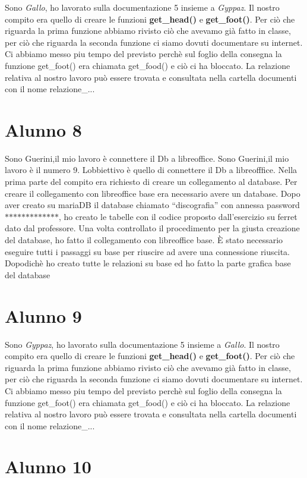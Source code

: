 Sono {\itshape Gallo}, ho lavorato sulla documentazione 5 insieme a {\itshape Gyppaz}. Il nostro compito era quello di creare le funzioni {\bfseries{get\+\_\+head()}} e {\bfseries{get\+\_\+foot()}}. Per ciò che riguarda la prima funzione abbiamo rivisto ciò che avevamo già fatto in classe, per ciò che riguarda la seconda funzione ci siamo dovuti documentare su internet. Ci abbiamo messo piu\textquotesingle{} tempo del previsto perchè sul foglio della consegna la funzione get\+\_\+foot() era chiamata get\+\_\+food() e ciò ci ha bloccato. La relazione relativa al nostro lavoro può essere trovata e consultata nella cartella documenti con il nome relazione\+\_... \section*{Alunno 8}

Sono Guerini,il mio lavoro è connettere il Db a libreoffice. Sono Guerini,il mio lavoro è il numero 9. L\textquotesingle{}obbiettivo è quello di connettere il Db a libreofffice. Nella prima parte del compito era richiesto di creare un collegamento al database. Per creare il collegamento con libreoffice base era necessario avere un database. Dopo aver creato su maria\+DB il database chiamato “discografia” con annessa password $\ast$$\ast$$\ast$$\ast$$\ast$$\ast$$\ast$$\ast$$\ast$$\ast$$\ast$$\ast$$\ast$, ho creato le tabelle con il codice proposto dall’esercizio su ferret dato dal professore. Una volta controllato il procedimento per la giusta creazione del database, ho fatto il collegamento con libreoffice base. È stato necessario eseguire tutti i passaggi su base per riuscire ad avere una connessione riuscita. Dopodichè ho creato tutte le relazioni su base ed ho fatto la parte grafica base del database \section*{Alunno 9}

Sono {\itshape Gyppaz}, ho lavorato sulla documentazione 5 insieme a {\itshape Gallo}. Il nostro compito era quello di creare le funzioni {\bfseries{get\+\_\+head()}} e {\bfseries{get\+\_\+foot()}}. Per ciò che riguarda la prima funzione abbiamo rivisto ciò che avevamo già fatto in classe, per ciò che riguarda la seconda funzione ci siamo dovuti documentare su internet. Ci abbiamo messo piu\textquotesingle{} tempo del previsto perchè sul foglio della consegna la funzione get\+\_\+foot() era chiamata get\+\_\+food() e ciò ci ha bloccato. La relazione relativa al nostro lavoro può essere trovata e consultata nella cartella documenti con il nome relazione\+\_... \section*{Alunno 10}

